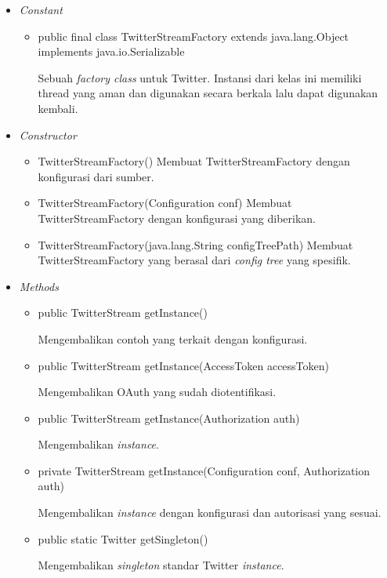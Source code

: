 	\begin{itemize}
		\item \textit{Constant}
		
		\begin{itemize}
			\item public final class TwitterStreamFactory
			extends java.lang.Object
			implements java.io.Serializable
			
			Sebuah \textit{factory class} untuk Twitter. Instansi dari kelas ini memiliki thread yang aman dan digunakan secara berkala lalu dapat digunakan kembali.
		\end{itemize}
		\item \textit{Constructor}
		
		\begin{itemize}
			\item TwitterStreamFactory()
			Membuat TwitterStreamFactory dengan konfigurasi dari sumber.
			\item TwitterStreamFactory(Configuration conf)
			Membuat TwitterStreamFactory dengan konfigurasi yang diberikan.
			\item TwitterStreamFactory(java.lang.String configTreePath)
			Membuat TwitterStreamFactory yang berasal dari \textit{config tree} yang spesifik.
		\end{itemize}
		\item \textit{Methods}
		
		\begin{itemize}
			\item public TwitterStream getInstance()
			
			Mengembalikan contoh yang terkait dengan konfigurasi.
			\item public TwitterStream getInstance(AccessToken accessToken)
			
			Mengembalikan OAuth yang sudah diotentifikasi.
			\item public TwitterStream getInstance(Authorization auth)
			
			Mengembalikan \textit{instance}.
			\item private TwitterStream getInstance(Configuration conf, Authorization auth)
			
			Mengembalikan \textit{instance} dengan konfigurasi dan autorisasi yang sesuai.
			\item public static Twitter getSingleton()
			
			Mengembalikan \textit{singleton} standar Twitter \textit{instance}.
		\end{itemize}
	\end{itemize}
	
